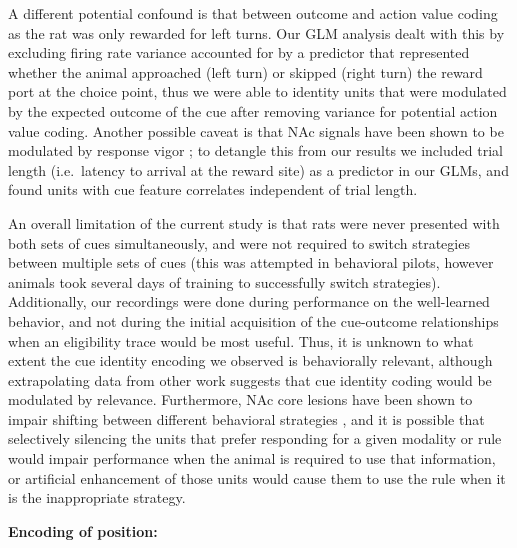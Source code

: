 \documentclass[11pt]{article}
\let\cite=\citep
\begin{document}
A different potential confound is that between outcome and action value coding as the rat was only rewarded for left turns. Our GLM analysis dealt with this by excluding firing rate variance accounted for by a predictor that represented whether the animal approached (left turn) or skipped (right turn) the reward port at the choice point, thus we were able to identity units that were modulated by the expected outcome of the cue after removing variance for potential action value coding. Another possible caveat is that NAc signals have been shown to be modulated by response vigor \cite{McGinty2013}; to detangle this from our results we included trial length (i.e.\ latency to arrival at the reward site) as a predictor in our GLMs, and found units with cue feature correlates independent of trial length.

An overall limitation of the current study is that rats were never presented with both sets of cues simultaneously, and were not required to switch strategies between multiple sets of cues (this was attempted in behavioral pilots, however animals took several days of training to successfully switch strategies). Additionally, our recordings were done during performance on the well-learned behavior, and not during the initial acquisition of the cue-outcome relationships when an eligibility trace would be most useful. Thus, it is unknown to what extent the cue identity encoding we observed is behaviorally relevant, although extrapolating data from other work \cite{Sleezer2016} suggests that cue identity coding would be modulated by relevance. Furthermore, NAc core lesions have been shown to impair shifting between different behavioral strategies \cite{Floresco2006a}, and it is possible that selectively silencing the units that prefer responding for a given modality or rule would impair performance when the animal is required to use that information, or artificial enhancement of those units would cause them to use the rule when it is the inappropriate strategy.

{\bf Encoding of position:}
\end{document}
